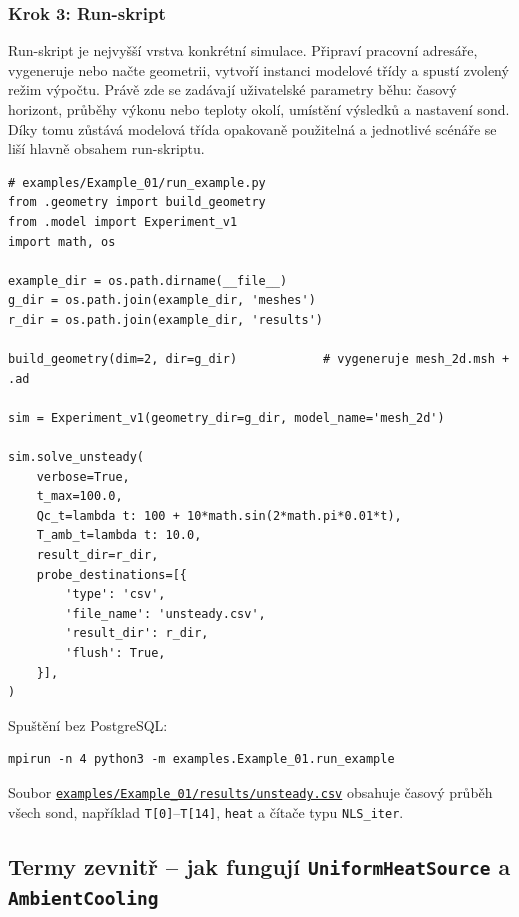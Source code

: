 \documentclass[a4paper,11pt]{article}
\newcommand{\GitHubExOneUnsteadyCSVURL}{https://github.com/LiborKudela/heat-battery/blob/master/examples/Example_01/results/unsteady.csv}
\newcommand{\GitHubExOneUnsteadyCSV}{\href{\GitHubExOneUnsteadyCSVURL}{\texttt{examples/Example\_01/results/unsteady.csv}}}
\begin{document}
\subsubsection*{Krok 3: Run-skript}

Run-skript je nejvyšší vrstva konkrétní simulace. Připraví pracovní adresáře,
vygeneruje nebo načte geometrii, vytvoří instanci modelové třídy a spustí
zvolený režim výpočtu. Právě zde se zadávají uživatelské parametry běhu: časový
horizont, průběhy výkonu nebo teploty okolí, umístění výsledků a nastavení sond.
Díky tomu zůstává modelová třída opakovaně použitelná a jednotlivé scénáře se
liší hlavně obsahem run-skriptu.

\begin{lstlisting}[style=py]
# examples/Example_01/run_example.py
from .geometry import build_geometry
from .model import Experiment_v1
import math, os

example_dir = os.path.dirname(__file__)
g_dir = os.path.join(example_dir, 'meshes')
r_dir = os.path.join(example_dir, 'results')

build_geometry(dim=2, dir=g_dir)            # vygeneruje mesh_2d.msh + .ad

sim = Experiment_v1(geometry_dir=g_dir, model_name='mesh_2d')

sim.solve_unsteady(
    verbose=True,
    t_max=100.0,
    Qc_t=lambda t: 100 + 10*math.sin(2*math.pi*0.01*t),
    T_amb_t=lambda t: 10.0,
    result_dir=r_dir,
    probe_destinations=[{
        'type': 'csv',
        'file_name': 'unsteady.csv',
        'result_dir': r_dir,
        'flush': True,
    }],
)
\end{lstlisting}

Spuštění bez PostgreSQL:

\begin{lstlisting}[style=bash]
mpirun -n 4 python3 -m examples.Example_01.run_example
\end{lstlisting}

Soubor \GitHubExOneUnsteadyCSV{} obsahuje časový průběh
všech sond, například \texttt{T[0]}--\texttt{T[14]}, \texttt{heat} a čítače typu
\texttt{NLS\_iter}.

\subsection{Termy zevnitř -- jak fungují \texttt{UniformHeatSource} a \texttt{AmbientCooling}}\label{sec:terms-inside}
\end{document}
